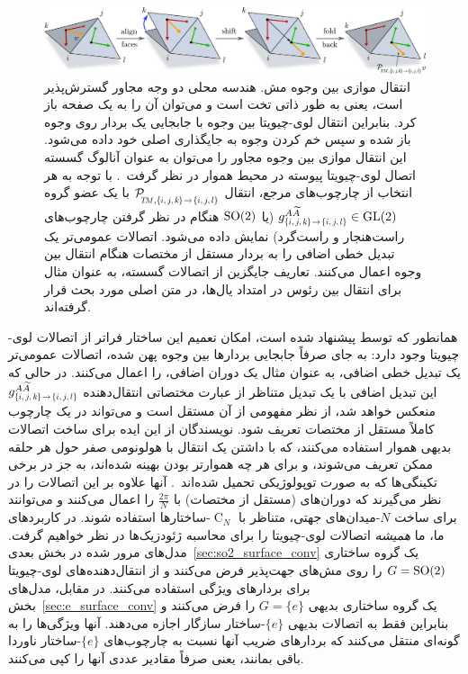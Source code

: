 \begin{figure}
    \centering
    \includegraphics[width=1.\textwidth]{figures/transport_mesh.pdf}
    \caption{\small
        انتقال موازی بین وجوه مش.
        هندسه محلی دو وجه مجاور گسترش‌پذیر است، یعنی به طور ذاتی تخت است و می‌توان آن را به یک صفحه باز کرد.
        بنابراین انتقال لوی-چیویتا بین وجوه با جابجایی یک بردار روی وجوه باز شده و سپس خم کردن وجوه به جایگذاری اصلی خود داده می‌شود.
        این انتقال موازی بین وجوه مجاور را می‌توان به عنوان آنالوگ گسسته اتصال لوی-چیویتا پیوسته در محیط هموار در نظر گرفت~\cite{craneTrivialConnectionsDiscrete2010}.
        با توجه به هر انتخاب از چارچوب‌های مرجع، انتقال
        $\mathcal{P}_{\mkern-2mu\overset{}{\protect\scalebox{.62}{$\!T\!M$},\protect\scalebox{.68}{$\{i,j,k\mkern-1mu\}\!\to\!\{i,j,l\}$}}}$
        با یک عضو گروه
        $g^{A\widetilde{A}}_{\protect\scalebox{.68}{$\{i,j,k\mkern-1mu\}\!\to\!\{i,j,l\}$}} \in \GL{2}$ (یا $\operatorname{SO}(2)$ هنگام در نظر گرفتن چارچوب‌های راست‌هنجار و راست‌گرد) نمایش داده می‌شود.
        اتصالات عمومی‌تر یک تبدیل خطی اضافی را به بردار مستقل از مختصات هنگام انتقال بین وجوه اعمال می‌کنند.
        تعاریف جایگزین از اتصالات گسسته، به عنوان مثال برای انتقال بین رئوس در امتداد یال‌ها، در متن اصلی مورد بحث قرار گرفته‌اند.
    }
    \label{fig:transport_mesh}
\end{figure}


همانطور که توسط \citet{craneTrivialConnectionsDiscrete2010} پیشنهاد شده است، امکان تعمیم این ساختار فراتر از اتصالات لوی-چیویتا وجود دارد:
به جای صرفاً جابجایی بردارها بین وجوه پهن شده، اتصالات عمومی‌تر یک تبدیل خطی اضافی، به عنوان مثال یک دوران اضافی، را اعمال می‌کنند.
در حالی که این تبدیل اضافی با یک تبدیل متناظر از عبارت مختصاتی انتقال‌دهنده
$g^{A\widetilde{A}}_{\protect\scalebox{.68}{$\{i,j,k\mkern-1mu\}\!\to\!\{i,j,l\}$}}$
منعکس خواهد شد، از نظر مفهومی از آن مستقل است و می‌تواند در یک چارچوب کاملاً مستقل از مختصات تعریف شود.
نویسندگان از این ایده برای ساخت اتصالات بدیهی هموار استفاده می‌کنند، که با داشتن یک انتقال با هولونومی صفر حول هر حلقه ممکن تعریف می‌شوند، و برای هر چه هموارتر بودن بهینه شده‌اند، به جز در برخی تکینگی‌ها که به صورت توپولوژیکی تحمیل شده‌اند~\cite{craneTrivialConnectionsDiscrete2010}.
آنها علاوه بر این اتصالات را در نظر می‌گیرند که دوران‌های (مستقل از مختصات) با $\frac{2\pi}{N}$ را اعمال می‌کنند و می‌توانند برای ساخت $N$-میدان‌های جهتی، متناظر با $\operatorname{C}_N$-ساختارها استفاده شوند.
در کاربردهای ما، ما \emph{همیشه} اتصالات لوی-چیویتا را برای محاسبه ژئودزیک‌ها در نظر خواهیم گرفت.
مدل‌های مرور شده در بخش بعدی~\ref{sec:so2_surface_conv} یک گروه ساختاری $G=\operatorname{SO}(2)$ را روی مش‌های جهت‌پذیر فرض می‌کنند و از انتقال‌دهنده‌های لوی-چیویتا برای بردارهای ویژگی استفاده می‌کنند.
در مقابل، مدل‌های بخش~\ref{sec:e_surface_conv} یک گروه ساختاری بدیهی $G=\{e\}$ را فرض می‌کنند و بنابراین فقط به اتصالات بدیهی $\{e\}$-ساختار سازگار اجازه می‌دهند.
آنها ویژگی‌ها را به گونه‌ای منتقل می‌کنند که بردارهای ضریب آنها نسبت به چارچوب‌های $\{e\}$-ساختار ناوردا باقی بمانند، یعنی صرفاً مقادیر عددی آنها را کپی می‌کنند.


